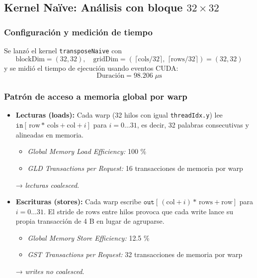 \documentclass[a4paper,11pt]{article}
\begin{document}




\subsection{Kernel Naïve: Análisis con bloque $32\times32$}

\subsubsection{Configuración y medición de tiempo}
Se lanzó el kernel \texttt{transposeNaive} con
\[
  \text{blockDim} = (32,32),\quad
  \text{gridDim}  = (\,\lceil\mathrm{cols}/32\rceil,\;\lceil\mathrm{rows}/32\rceil)
  = (32,32)
\]
y se midió el tiempo de ejecución usando eventos CUDA:
\[
  \text{Duración} = 98.206\;\mu\text{s}
\]

\subsubsection{Patrón de acceso a memoria global por warp}
\begin{itemize}
  \item \textbf{Lecturas (loads):}  
    Cada warp (32 hilos con igual \texttt{threadIdx.y}) lee  
    \(\texttt{in}[\,\text{row}*\,\mathrm{cols} + \text{col}+i]\) para \(i=0\ldots31\),  
    es decir, 32 palabras consecutivas y alineadas en memoria.  
    \begin{itemize}
      \item \emph{Global Memory Load Efficiency:} 100 \%  
      \item \emph{GLD Transactions per Request:} 16 transacciones de memoria por warp  
    \end{itemize}
    → \emph{lecturas coalesced}.
  \item \textbf{Escrituras (stores):}  
    Cada warp escribe  
    \(\texttt{out}[\,(\text{col}+i)*\,\mathrm{rows} + \text{row}]\) para \(i=0\ldots31\).  
    El stride de \(\mathrm{rows}\) entre hilos provoca que cada write lance  
    su propia transacción de 4 B en lugar de agruparse.  
    \begin{itemize}
      \item \emph{Global Memory Store Efficiency:} 12.5 \%  
      \item \emph{GST Transactions per Request:} 32 transacciones de memoria por warp  
    \end{itemize}
    → \emph{writes no coalesced}.
\end{itemize}
\end{document}
